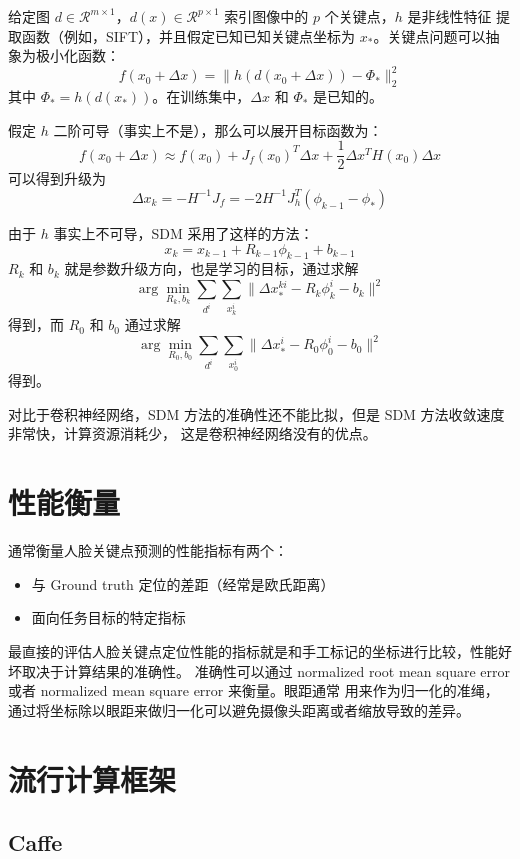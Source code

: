 \documentclass{ctexart}
\begin{document}
给定图 $d \in \mathcal{R}^{m\times 1}$，$d(x) \in \mathcal{R}^{p \times 1}$ 索引图像中的 $p$ 个关键点，$h$ 是非线性特征
提取函数（例如，SIFT），并且假定已知已知关键点坐标为 $x_*$。关键点问题可以抽象为极小化函数：
$$
f(x_0 + \Delta x) = \| h(d(x_0 + \Delta x)) - \Phi_* \|_2^2
$$
其中 $\Phi_* = h(d(x_*))$。在训练集中，$\Delta x$ 和 $\Phi_*$ 是已知的。

假定 $h$ 二阶可导（事实上不是），那么可以展开目标函数为：
$$
f(x_0 + \Delta x) \approx f(x_0) + J_f(x_0)^T \Delta x + \frac 1 2 \Delta x^T H(x_0) \Delta x
$$
可以得到升级为
$$
\Delta x_k = -H^{-1} J_f = -2 H^{-1} J_h^T(\phi_{k-1} - \phi_*)
$$

由于 $h$ 事实上不可导，SDM 采用了这样的方法：
$$
x_k = x_{k-1} + R_{k-1} \phi_{k-1} + b_{k-1}
$$
$R_k$ 和 $b_k$ 就是参数升级方向，也是学习的目标，通过求解
$$
\arg\min_{R_k, b_k} \sum_{d^i} \sum_{x_k^i} \| \Delta x_*^{ki} - R_k \phi_k^i - b_k \|^2
$$
得到，而 $R_0$ 和 $b_0$ 通过求解
$$
\arg\min_{R_0, b_0} \sum_{d^i} \sum_{x_0^i} \| \Delta x_*^{i} - R_0 \phi_0^i - b_0 \|^2
$$
得到。

对比于卷积神经网络，SDM 方法的准确性还不能比拟，但是 SDM 方法收敛速度非常快，计算资源消耗少，
这是卷积神经网络没有的优点。

\section{性能衡量}

通常衡量人脸关键点预测的性能指标有两个：

\begin{itemize}
	\item 与 Ground truth 定位的差距（经常是欧氏距离）
	\item 面向任务目标的特定指标
\end{itemize}

最直接的评估人脸关键点定位性能的指标就是和手工标记的坐标进行比较，性能好坏取决于计算结果的准确性。
准确性可以通过 normalized root mean square error 或者 normalized mean square error 来衡量。眼距通常
用来作为归一化的准绳，通过将坐标除以眼距来做归一化可以避免摄像头距离或者缩放导致的差异。

\section{流行计算框架}

\subsection{Caffe}
\end{document}
